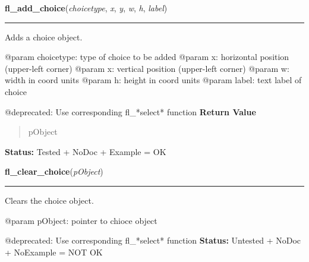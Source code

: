     \vspace{0.5ex}

\hspace{.8\funcindent}\begin{boxedminipage}{\funcwidth}

    \raggedright \textbf{fl\_add\_choice}(\textit{choicetype}, \textit{x}, \textit{y}, \textit{w}, \textit{h}, \textit{label})

    \vspace{-1.5ex}

    \rule{\textwidth}{0.5\fboxrule}
\setlength{\parskip}{2ex}

Adds a choice object.

@param choicetype: type of choice to be added
@param x: horizontal position (upper-left corner)
@param x: vertical position (upper-left corner)
@param w: width in coord units
@param h: height in coord units
@param label: text label of choice

@deprecated: Use corresponding fl\_*select* function
\setlength{\parskip}{1ex}
      \textbf{Return Value}
    \vspace{-1ex}

      \begin{quote}

pObject
      \end{quote}

\textbf{Status:} 
Tested + NoDoc + Example = OK


    \end{boxedminipage}

    \label{xformslib:deprecated:fl_clear_choice}

    \vspace{0.5ex}

\hspace{.8\funcindent}\begin{boxedminipage}{\funcwidth}

    \raggedright \textbf{fl\_clear\_choice}(\textit{pObject})

    \vspace{-1.5ex}

    \rule{\textwidth}{0.5\fboxrule}
\setlength{\parskip}{2ex}

Clears the choice object.

@param pObject: pointer to chioce object

@deprecated: Use corresponding fl\_*select* function
\setlength{\parskip}{1ex}
\textbf{Status:} 
Untested + NoDoc + NoExample = NOT OK


    \end{boxedminipage}

